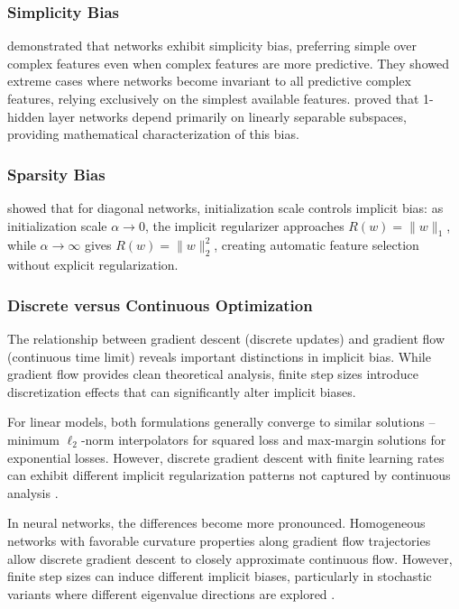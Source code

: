 \documentclass[11pt]{article}
\begin{document}
\subsubsection{Simplicity Bias}
\citet{shah2020pitfalls} demonstrated that networks exhibit simplicity bias, preferring simple over complex features even when complex features are more predictive. They showed extreme cases where networks become invariant to all predictive complex features, relying exclusively on the simplest available features. \citet{morwani2023simplicity} proved that 1-hidden layer networks depend primarily on linearly separable subspaces, providing mathematical characterization of this bias.

\subsubsection{Sparsity Bias}
\citet{woodworth2020kernel} showed that for diagonal networks, initialization scale controls implicit bias: as initialization scale $\alpha \to 0$, the implicit regularizer approaches $R(w) = \|w\|_1$, while $\alpha \to \infty$ gives $R(w) = \|w\|_2^2$, creating automatic feature selection without explicit regularization.

\subsubsection{Discrete versus Continuous Optimization}

The relationship between gradient descent (discrete updates) and gradient flow (continuous time limit) reveals important distinctions in implicit bias. While gradient flow provides clean theoretical analysis, finite step sizes introduce discretization effects that can significantly alter implicit biases.

For linear models, both formulations generally converge to similar solutions -- minimum $\ell_2$-norm interpolators for squared loss and max-margin solutions for exponential losses. However, discrete gradient descent with finite learning rates can exhibit different implicit regularization patterns not captured by continuous analysis \citep{pesme2021continuous}.

In neural networks, the differences become more pronounced. Homogeneous networks with favorable curvature properties along gradient flow trajectories allow discrete gradient descent to closely approximate continuous flow. However, finite step sizes can induce different implicit biases, particularly in stochastic variants where different eigenvalue directions are explored \citep{mulayoff2021continuous}.
\end{document}

